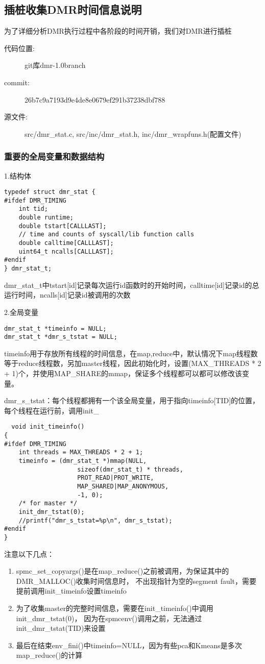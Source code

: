 \subsection{插桩收集DMR时间信息说明}
为了详细分析DMR执行过程中各阶段的时间开销，我们对DMR进行插桩
\begin{description}
  \item[代码位置:] git库dmr-1.0branch
  \item[commit:] 26b7c9a7193d9e4de8e0679ef291b37238dbf788
  \item[源文件:] src/dmr\_stat.c, src/inc/dmr\_stat.h, inc/dmr\_wrapfuns.h(配置文件)
\end{description}

\subsubsection{重要的全局变量和数据结构}
1.结构体
\begin{lstlisting}
typedef struct dmr_stat {
#ifdef DMR_TIMING
    int tid;
    double runtime;
    double tstart[CALLLAST];
    // time and counts of syscall/lib function calls
    double calltime[CALLLAST];
    uint64_t ncalls[CALLLAST];
#endif
} dmr_stat_t;
\end{lstlisting}
dmr\_stat\_t中tstart[id]记录每次运行id函数时的开始时间，calltime[id]记录id的总运行时间，ncalls[id]记录id被调用的次数

2.全局变量
\begin{lstlisting}
dmr_stat_t *timeinfo = NULL;
dmr_stat_t *dmr_s_tstat = NULL;
\end{lstlisting}
timeinfo用于存放所有线程的时间信息，在map,reduce中，默认情况下map线程数等于reduce线程数，另加master线程，因此初始化时，设置(MAX\_THREADS * 2 + 1)个，并使用MAP\_SHARE的mmap，保证多个线程都可以都可以修改该变量。

dmr\_s\_tstat：每个线程都拥有一个该全局变量，用于指向timeinfo[TID]的位置，每个线程在运行前，调用init\_
\begin{lstlisting}
  void init_timeinfo()
{
#ifdef DMR_TIMING
    int threads = MAX_THREADS * 2 + 1;
    timeinfo = (dmr_stat_t *)mmap(NULL,
                    sizeof(dmr_stat_t) * threads,
                    PROT_READ|PROT_WRITE,
                    MAP_SHARED|MAP_ANONYMOUS,
                    -1, 0);
    /* for master */
    init_dmr_tstat(0); 
    //printf("dmr_s_tstat=%p\n", dmr_s_tstat);
#endif
}
\end{lstlisting}
注意以下几点：
\begin{enumerate}
  \item spmc\_set\_copyargs()是在map\_reduce()之前被调用，为保证其中的DMR\_MALLOC()收集时间信息时，
  不出现指针为空的segment fault，需要提前调用init\_timeinfo设置timeinfo
  \item 为了收集master的完整时间信息，需要在init\_timeinfo()中调用init\_dmr\_tstat(0)，
  因为在spmcenv()调用之前，无法通过init\_dmr\_tstat(TID)来设置
  \item 最后在结束env\_fini()中timeinfo=NULL，因为有些pca和Kmeans是多次map\_reduce()的计算
\end{enumerate}

